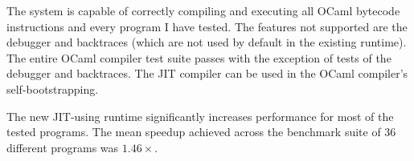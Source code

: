The system is capable of correctly compiling and executing all OCaml
bytecode instructions and every program I have tested. The features not supported are
the debugger and backtraces (which are not used by default in the existing runtime). The entire
OCaml compiler test suite passes with the exception of tests of
the debugger and backtraces. The JIT compiler can be used in the OCaml compiler's
self-bootstrapping.

The new JIT-using runtime significantly increases performance for most of the tested programs.
The mean speedup achieved across the benchmark suite of 36 different programs was $1.46 \times$.
